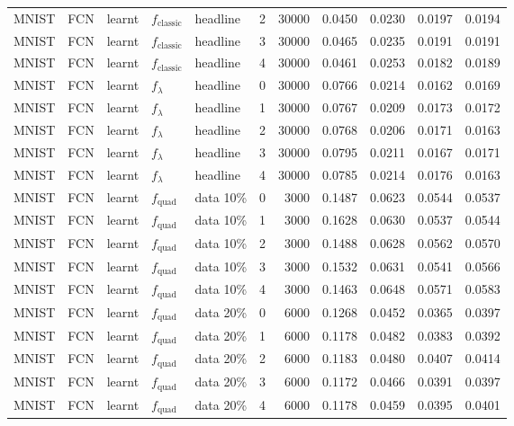 {\begin{longtable}[]{@{}lllllr r r r r r@{}}
MNIST & FCN & learnt & $f_{\text{classic}}$ & headline & 2 & 30000 & 0.0450 & 0.0230 & 0.0197 & 0.0194 \\
MNIST & FCN & learnt & $f_{\text{classic}}$ & headline & 3 & 30000 & 0.0465 & 0.0235 & 0.0191 & 0.0191 \\
MNIST & FCN & learnt & $f_{\text{classic}}$ & headline & 4 & 30000 & 0.0461 & 0.0253 & 0.0182 & 0.0189 \\
\addlinespace[2pt]
MNIST & FCN & learnt & $f_{\lambda}$ & headline & 0 & 30000 & 0.0766 & 0.0214 & 0.0162 & 0.0169 \\
MNIST & FCN & learnt & $f_{\lambda}$ & headline & 1 & 30000 & 0.0767 & 0.0209 & 0.0173 & 0.0172 \\
MNIST & FCN & learnt & $f_{\lambda}$ & headline & 2 & 30000 & 0.0768 & 0.0206 & 0.0171 & 0.0163 \\
MNIST & FCN & learnt & $f_{\lambda}$ & headline & 3 & 30000 & 0.0795 & 0.0211 & 0.0167 & 0.0171 \\
MNIST & FCN & learnt & $f_{\lambda}$ & headline & 4 & 30000 & 0.0785 & 0.0214 & 0.0176 & 0.0163 \\
\addlinespace[2pt]
MNIST & FCN & learnt & $f_{\text{quad}}$ & data 10\% & 0 & 3000 & 0.1487 & 0.0623 & 0.0544 & 0.0537 \\
MNIST & FCN & learnt & $f_{\text{quad}}$ & data 10\% & 1 & 3000 & 0.1628 & 0.0630 & 0.0537 & 0.0544 \\
MNIST & FCN & learnt & $f_{\text{quad}}$ & data 10\% & 2 & 3000 & 0.1488 & 0.0628 & 0.0562 & 0.0570 \\
MNIST & FCN & learnt & $f_{\text{quad}}$ & data 10\% & 3 & 3000 & 0.1532 & 0.0631 & 0.0541 & 0.0566 \\
MNIST & FCN & learnt & $f_{\text{quad}}$ & data 10\% & 4 & 3000 & 0.1463 & 0.0648 & 0.0571 & 0.0583 \\
\addlinespace[2pt]
MNIST & FCN & learnt & $f_{\text{quad}}$ & data 20\% & 0 & 6000 & 0.1268 & 0.0452 & 0.0365 & 0.0397 \\
MNIST & FCN & learnt & $f_{\text{quad}}$ & data 20\% & 1 & 6000 & 0.1178 & 0.0482 & 0.0383 & 0.0392 \\
MNIST & FCN & learnt & $f_{\text{quad}}$ & data 20\% & 2 & 6000 & 0.1183 & 0.0480 & 0.0407 & 0.0414 \\
MNIST & FCN & learnt & $f_{\text{quad}}$ & data 20\% & 3 & 6000 & 0.1172 & 0.0466 & 0.0391 & 0.0397 \\
MNIST & FCN & learnt & $f_{\text{quad}}$ & data 20\% & 4 & 6000 & 0.1178 & 0.0459 & 0.0395 & 0.0401 \\

\end{longtable}}
